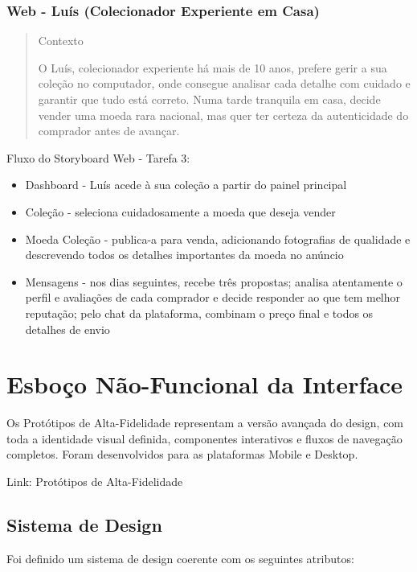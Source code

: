 \documentclass[12pt,a4paper]{article}
\begin{document}
\subsubsection{Web - Luís (Colecionador Experiente em Casa)}

\begin{quote}
\small
Contexto\par
O Luís, colecionador experiente há mais de 10 anos, prefere gerir a sua coleção no computador, onde consegue analisar cada detalhe com cuidado e garantir que tudo está correto. Numa tarde tranquila em casa, decide vender uma moeda rara nacional, mas quer ter certeza da autenticidade do comprador antes de avançar.
\end{quote}

Fluxo do Storyboard Web - Tarefa 3:

\begin{itemize}
\setlength{\itemsep}{0.15em}
\item Dashboard - Luís acede à sua coleção a partir do painel principal
\item Coleção - seleciona cuidadosamente a moeda que deseja vender
\item Moeda Coleção - publica-a para venda, adicionando fotografias de qualidade e descrevendo todos os detalhes importantes da moeda no anúncio
\item Mensagens - nos dias seguintes, recebe três propostas; analisa atentamente o perfil e avaliações de cada comprador e decide responder ao que tem melhor reputação; pelo chat da plataforma, combinam o preço final e todos os detalhes de envio
\end{itemize}

\section{Esboço Não-Funcional da Interface}

Os Protótipos de Alta-Fidelidade representam a versão avançada do design, com toda a identidade visual definida, componentes interativos e fluxos de navegação completos. Foram desenvolvidos para as plataformas Mobile e Desktop.

Link: Protótipos de Alta-Fidelidade

\subsection{Sistema de Design}

Foi definido um sistema de design coerente com os seguintes atributos:
\end{document}
